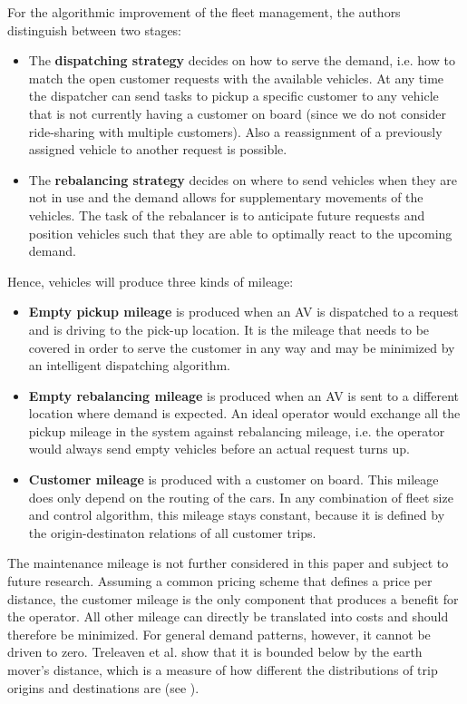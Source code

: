 For the algorithmic improvement of the fleet management, the authors distinguish
between two stages:

\begin{itemize}
\item The \textbf{dispatching strategy} decides on how to serve the demand, i.e.
how to match the open customer requests with the available vehicles. At any time the dispatcher can send tasks to pickup a specific customer to any vehicle that is not currently having a customer on board (since we do not consider ride-sharing with multiple customers). Also a reassignment of a previously assigned
vehicle to another request is possible.
\item The \textbf{rebalancing strategy} decides on where to send vehicles when they
are not in use and the demand allows for supplementary movements of the vehicles.
The task of the rebalancer is to anticipate future requests and position vehicles
such that they are able to optimally react to the upcoming demand.
\end{itemize}

Hence, vehicles will produce three kinds of mileage:

\begin{itemize}
\item \textbf{Empty pickup mileage} is produced when an AV is dispatched
to a request and is driving to the pick-up location. It is the mileage that needs
to be covered in order to serve the customer in any way and may be minimized
by an intelligent dispatching algorithm.
\item \textbf{Empty rebalancing mileage} is produced when an AV is sent
to a different location where demand is expected. An ideal operator would
exchange all the pickup mileage in the system against rebalancing mileage, i.e. the operator would always send empty vehicles before an actual request turns up.
\item \textbf{Customer mileage} is produced with a customer on board. This mileage does only depend on the routing of the cars. In any combination of fleet size and control algorithm, this mileage stays constant, because it is defined by the origin-destinaton relations of all customer trips.
\end{itemize}

The maintenance mileage is not further considered in this paper and subject to future research.
Assuming a common pricing scheme that defines a price per distance, the customer mileage
is the only component that produces a benefit for the operator. All other mileage
can directly be translated into costs and should therefore be minimized. For general
demand patterns, however, it cannot be driven to zero. Treleaven et al. \cite{treleaven2011asymptotically}
show that it is bounded below by the earth mover's distance, which is a measure
of how different the distributions of trip origins and destinations are (see \cite{ruschendorf1985wasserstein}).

